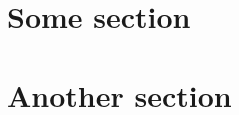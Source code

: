 \documentclass{article}
\begin{document}
\section{Some section}
\cite{inbook-full}
\section{Another section}
\cite{booklet-full,manual-full}



\end{document}
